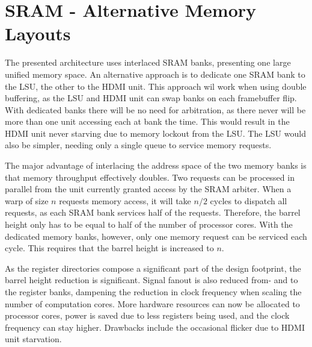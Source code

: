 \section{SRAM - Alternative Memory Layouts}

The presented architecture uses interlaced SRAM banks, presenting one large unified memory space.
An alternative approach is to dedicate one SRAM bank to the LSU, the other to the HDMI unit.
This approach wil work when using double buffering, as the LSU and HDMI unit can swap banks on each framebuffer flip.
With dedicated banks there will be no need for arbitration, as there never will be more than one unit accessing each at bank the time.
This would result in the HDMI unit never starving due to memory lockout from the LSU.
The LSU would also be simpler, needing only a single queue to service memory requests.

The major advantage of interlacing the address space of the two memory banks is that memory throughput effectively doubles.
Two requests can be processed in parallel from the unit currently granted access by the SRAM arbiter.
When a warp of size $n$ requests memory access, it will take $n/2$ cycles to dispatch all requests, as each SRAM bank services half of the requests.
Therefore, the barrel height only has to be equal to half of the number of processor cores.
With the dedicated memory banks, however, only one memory request can be serviced each cycle.
This requires that the barrel height is increased to $n$.

As the register directories compose a significant part of the design footprint, the barrel height reduction is significant.
Signal fanout is also reduced from- and to the register banks, dampening the reduction in clock frequency when scaling the number of computation cores.
More hardware resources can now be allocated to processor cores, power is saved due to less registers being used, and the clock frequency can stay higher.
Drawbacks include the occasional flicker due to HDMI unit starvation.
